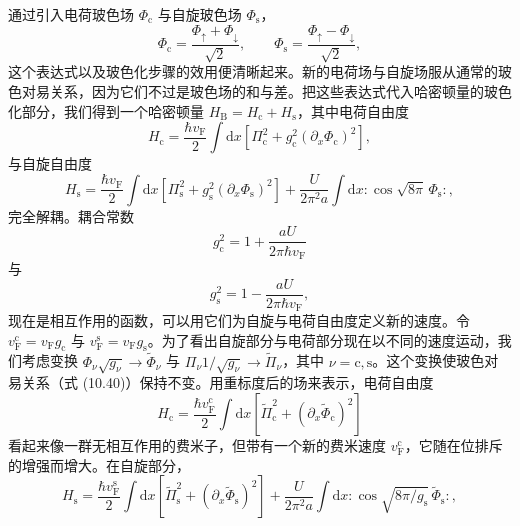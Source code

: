 通过引入电荷玻色场 $\Phi_{\mathrm{c}}$ 与自旋玻色场 $\Phi_{\mathrm{s}}$，
\begin{equation*}
\Phi_{\mathrm{c}}=\frac{\Phi_{\uparrow}+\Phi_{\downarrow}}{\sqrt{2}},\qquad\Phi_{\mathrm{s}}=\frac{\Phi_{\uparrow}-\Phi_{\downarrow}}{\sqrt{2}},
\tag{10.58}
\end{equation*}
这个表达式以及玻色化步骤的效用便清晰起来。新的电荷场与自旋场服从通常的玻色对易关系，因为它们不过是玻色场的和与差。把这些表达式代入哈密顿量的玻色化部分，我们得到一个哈密顿量 $H_{\mathrm{B}}=H_{\mathrm{c}}+H_{\mathrm{s}}$，其中电荷自由度
\begin{equation*}
H_{\mathrm{c}}=\frac{\hbar v_{\mathrm{F}}}{2}\int\mathrm{d}x\left[\Pi_{\mathrm{c}}^{2}+g_{\mathrm{c}}^{2}(\partial_{x}\Phi_{\mathrm{c}})^{2}\right],
\tag{10.59}
\end{equation*}
与自旋自由度
\begin{equation*}
H_{\mathrm{s}}=\frac{\hbar v_{\mathrm{F}}}{2}\int\mathrm{d}x\left[\Pi_{\mathrm{s}}^{2}+g_{\mathrm{s}}^{2}(\partial_{x}\Phi_{\mathrm{s}})^{2}\right]+\frac{U}{2\pi^{2}a}\int\mathrm{d}x:\cos\sqrt{8\pi}\,\Phi_{\mathrm{s}}:,
\tag{10.60}
\end{equation*}
完全解耦。耦合常数
\begin{equation*}
g_{\mathrm{c}}^{2}=1+\frac{aU}{2\pi\hbar v_{\mathrm{F}}}
\tag{10.61}
\end{equation*}
与
\begin{equation*}
g_{\mathrm{s}}^{2}=1-\frac{aU}{2\pi\hbar v_{\mathrm{F}}},
\tag{10.62}
\end{equation*}
现在是相互作用的函数，可以用它们为自旋与电荷自由度定义新的速度。令 $v_{\mathrm{F}}^{\mathrm{c}}=v_{\mathrm{F}}g_{\mathrm{c}}$ 与 $v_{\mathrm{F}}^{\mathrm{s}}=v_{\mathrm{F}}g_{\mathrm{s}}$。为了看出自旋部分与电荷部分现在以不同的速度运动，我们考虑变换 $\Phi_{\nu}\sqrt{g_{\nu}}\to\tilde{\Phi}_{\nu}$ 与 $\Pi_{\nu}1/\sqrt{g_{\nu}}\to\tilde{\Pi}_{\nu}$，其中 $\nu=\mathrm{c},\mathrm{s}$。这个变换使玻色对易关系（式 (10.40)）保持不变。用重标度后的场来表示，电荷自由度
\begin{equation*}
H_{\mathrm{c}}=\frac{\hbar v_{\mathrm{F}}^{\mathrm{c}}}{2}\int\mathrm{d}x\left[\tilde{\Pi}_{\mathrm{c}}^{2}+(\partial_{x}\tilde{\Phi}_{\mathrm{c}})^{2}\right]
\tag{10.63}
\end{equation*}
看起来像一群无相互作用的费米子，但带有一个新的费米速度 $v_{\mathrm{F}}^{\mathrm{c}}$，它随在位排斥的增强而增大。在自旋部分，
\begin{equation*}
H_{\mathrm{s}}=\frac{\hbar v_{\mathrm{F}}^{\mathrm{s}}}{2}\int\mathrm{d}x\left[\tilde{\Pi}_{\mathrm{s}}^{2}+(\partial_{x}\tilde{\Phi}_{\mathrm{s}})^{2}\right]+\frac{U}{2\pi^{2}a}\int\mathrm{d}x:\cos\sqrt{8\pi/g_{\mathrm{s}}}\,\tilde{\Phi}_{\mathrm{s}}:,
\tag{10.64}
\end{equation*}
